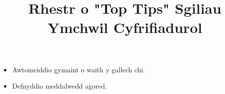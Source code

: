 \documentclass{article}
\title{Rhestr o "Top Tips" Sgiliau Ymchwil Cyfrifiadurol}
\date{}
\begin{document}
\maketitle

\begin{itemize}
  \item Awtomeiddio gymaint o waith y gallech chi.
  \item Defnyddio meddalwedd agored.
\end{itemize}
\end{document}
